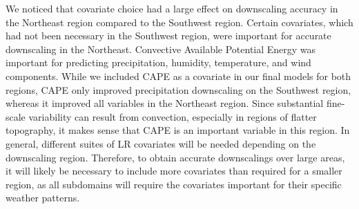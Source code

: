 \documentclass{ametsocV6.1}
\begin{document}
We noticed that covariate choice had a large effect on downscaling accuracy in the Northeast region compared to the Southwest region. Certain covariates, which had not been necessary in the Southwest region, were important for accurate downscaling in the Northeast. Convective Available Potential Energy was important for predicting precipitation, humidity, temperature, and wind components. While we included CAPE as a covariate in our final models for both regions, CAPE only improved precipitation downscaling on the Southwest region, whereas it improved all variables in the Northeast region. Since substantial fine-scale variability can result from convection, especially in regions of flatter topography, it makes sense that CAPE is an important variable in this region. In general, different suites of LR covariates will be needed depending on the downscaling region. Therefore, to obtain accurate downscalings over large areas, it will likely be necessary to include more covariates than required for a smaller region, as all subdomains will require the covariates important for their specific weather patterns.
\end{document}
